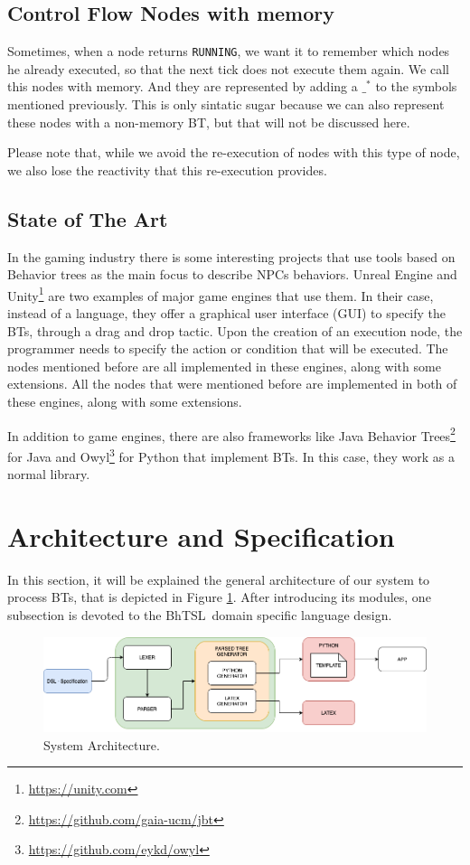 \documentclass[a4paper,UKenglish,cleveref, autoref, thm-restate]{oasics-v2019}
\def\bht{BhTSL}
\begin{document}
\subsection{Control Flow Nodes with memory}
Sometimes, when a node returns \texttt{RUNNING}, we want it to remember which nodes he already executed, so that the next tick does not execute them again.
We call this nodes with memory.
And they are represented by adding a $\_^*$ to the symbols mentioned previously.
This is only sintatic sugar because we can also represent these nodes with a non-memory BT, but that will not be discussed here.

Please note that, while we avoid the re-execution of nodes with this type of node, we also lose the reactivity that this re-execution provides.

\subsection{State of The Art}
\label{subsec:state-of-the-art}
In the gaming industry there is some interesting projects that use tools based on Behavior trees as the main focus to describe NPCs behaviors.
Unreal Engine \cite{UnrealEngine} and Unity\footnote{\raggedright\url{https://unity.com}} are two examples of major game engines that use them.
In their case, instead of a language, they offer a graphical user interface (GUI) to specify the BTs, through a drag and drop tactic.
Upon the creation of an execution node, the programmer needs to specify the action or condition that will be executed.
The nodes mentioned before are all implemented in these engines, along with some extensions.
All the nodes that were mentioned before are implemented in both of these engines, along with some extensions.

In addition to game engines, there are also frameworks like Java Behavior Trees\footnote{\url{https://github.com/gaia-ucm/jbt}} for Java and Owyl\footnote{\url{https://github.com/eykd/owyl}} for Python that implement BTs.
In this case, they work as a normal library.

\section{Architecture and Specification}
\label{sec:arc-spec}
In this section, it will be explained the general architecture of our system to process BTs, 
that is depicted in Figure \ref{fig:architecture}. 
After introducing its modules, one subsection is devoted to the \bht\ domain specific language design.
\begin{figure}[h]
    \includegraphics[width=\columnwidth]{architecture.png}
    \caption{System Architecture.}
    \label{fig:architecture}
\end{figure}
\end{document}
